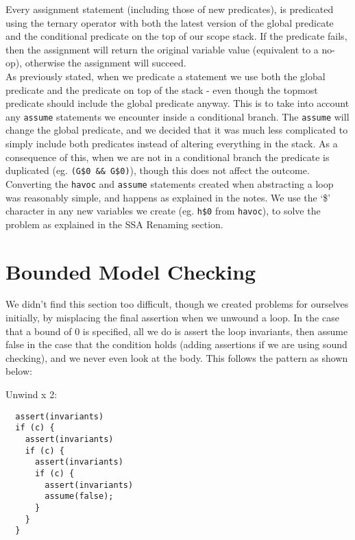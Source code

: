 \documentclass[11pt]{article}
\begin{document}
Every assignment statement (including those of new predicates), is predicated using the ternary operator with both the latest version of the global predicate and the conditional predicate on the top of our scope stack. If the predicate fails, then the assignment will return the original variable value (equivalent to a no-op), otherwise the assignment will succeed. \\

As previously stated, when we predicate a statement we use both the global predicate and the predicate on top of the stack - even though the topmost predicate should include the global predicate anyway. This is to take into account any \verb|assume| statements we encounter inside a conditional branch. The \verb|assume| will change the global predicate, and we decided that it was much less complicated to simply include both predicates instead of altering everything in the stack. As a consequence of this, when we are not in a conditional branch the predicate is duplicated (eg. \verb|(G$0 && G$0)|), though this does not affect the outcome. \\

Converting the \verb|havoc| and \verb|assume| statements created when abstracting a loop was reasonably simple, and happens as explained in the notes. We use the `\$' character in any new variables we create (eg. \verb|h$0| from \verb|havoc|), to solve the problem as explained in the SSA Renaming section. \\

\section{Bounded Model Checking}

We didn't find this section too difficult, though we created problems for ourselves initially, by misplacing the final assertion when we unwound a loop. In the case that a bound of 0 is specified, all we do is assert the loop invariants, then assume false in the case that the condition holds (adding assertions if we are using sound checking), and we never even look at the body. This follows the pattern as shown below: \\

\clearpage

Unwind x 2:
\begin{verbatim}
  assert(invariants)
  if (c) {
    assert(invariants)
    if (c) {
      assert(invariants)
      if (c) {
        assert(invariants)
        assume(false);
      }
    }
  }
\end{verbatim}
\end{document}
